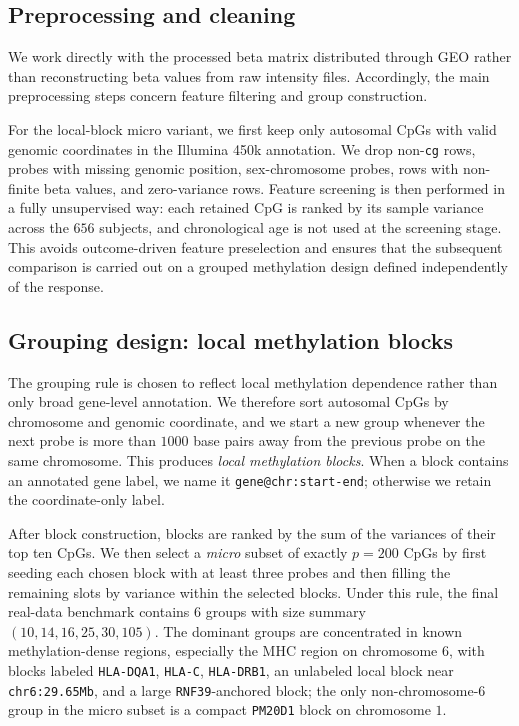 \documentclass[11pt]{article}
\begin{document}
\subsection{Preprocessing and cleaning}

We work directly with the processed beta matrix distributed through GEO rather
than reconstructing beta values from raw intensity files. Accordingly, the main
preprocessing steps concern feature filtering and group construction.

For the local-block micro variant, we first keep only autosomal CpGs with valid
genomic coordinates in the Illumina 450k annotation. We drop non-\texttt{cg}
rows, probes with missing genomic position, sex-chromosome probes, rows with
non-finite beta values, and zero-variance rows. Feature screening is then
performed in a fully unsupervised way: each retained CpG is ranked by its
sample variance across the \(656\) subjects, and chronological age is not used
at the screening stage. This avoids outcome-driven feature preselection and
ensures that the subsequent comparison is carried out on a grouped methylation
design defined independently of the response.

\subsection{Grouping design: local methylation blocks}

The grouping rule is chosen to reflect local methylation dependence rather than
only broad gene-level annotation. We therefore sort autosomal CpGs by
chromosome and genomic coordinate, and we start a new group
whenever the next probe is more than \(1000\) base pairs away from the previous
probe on the same chromosome. This produces \emph{local methylation blocks}.
When a block contains an annotated gene label, we name it
\texttt{gene@chr:start-end}; otherwise we retain the coordinate-only label.

After block construction, blocks are ranked by the sum of the variances of
their top ten CpGs. We then select a \emph{micro} subset of exactly \(p=200\)
CpGs by first seeding each chosen block with at least three probes and then
filling the remaining slots by variance within the selected blocks. Under this
rule, the final real-data benchmark contains \(6\) groups with size summary
\((10, 14, 16, 25, 30, 105)\). The dominant groups are concentrated in known
methylation-dense regions, especially the MHC region on chromosome \(6\), with
blocks labeled \texttt{HLA-DQA1}, \texttt{HLA-C}, \texttt{HLA-DRB1}, an
unlabeled local block near \texttt{chr6:29.65Mb}, and a large
\texttt{RNF39}-anchored block; the only non-chromosome-6 group in the micro
subset is a compact \texttt{PM20D1} block on chromosome \(1\).
\end{document}
